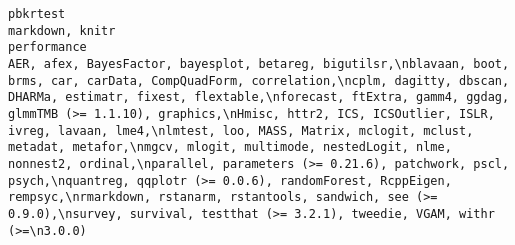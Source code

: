 \documentclass[
  letterpaper,
  DIV=11,
  numbers=noendperiod]{scrreprt}
\begin{document}
\begin{verbatim}
pbkrtest                                                                                                                                                                                                                                                                                                                                                                                                                                                                                                                                                                                                                                                                                                                                                                                                                                                                                                                                                                                                                                                                                                                                                                                                                                                                                      markdown, knitr
performance                                                                                                                                                                                                                                                                                                                                                                                                                                                                                                                                                                                    AER, afex, BayesFactor, bayesplot, betareg, bigutilsr,\nblavaan, boot, brms, car, carData, CompQuadForm, correlation,\ncplm, dagitty, dbscan, DHARMa, estimatr, fixest, flextable,\nforecast, ftExtra, gamm4, ggdag, glmmTMB (>= 1.1.10), graphics,\nHmisc, httr2, ICS, ICSOutlier, ISLR, ivreg, lavaan, lme4,\nlmtest, loo, MASS, Matrix, mclogit, mclust, metadat, metafor,\nmgcv, mlogit, multimode, nestedLogit, nlme, nonnest2, ordinal,\nparallel, parameters (>= 0.21.6), patchwork, pscl, psych,\nquantreg, qqplotr (>= 0.0.6), randomForest, RcppEigen, rempsyc,\nrmarkdown, rstanarm, rstantools, sandwich, see (>= 0.9.0),\nsurvey, survival, testthat (>= 3.2.1), tweedie, VGAM, withr (>=\n3.0.0)

\end{verbatim}
\end{document}
